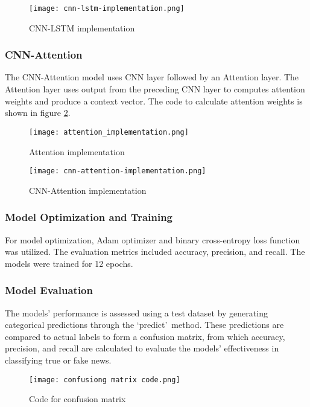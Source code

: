 \begin{figure}[h]
    \centering
    \texttt{[image: cnn-lstm-implementation.png]}
    \caption{CNN-LSTM implementation}
    \label{fig:cnn-lstm-implementation}
\end{figure}

\subsubsection{CNN-Attention}
The CNN-Attention model uses CNN layer followed by an Attention layer. The Attention layer uses output from the preceding CNN layer to computes attention weights and produce a context vector. The code to calculate attention weights is shown in figure \ref{fig:attention-implementation}.

\begin{figure}[h]
    \centering
    \texttt{[image: attention\_implementation.png]}
    \caption{Attention implementation}
    \label{fig:attention-implementation}
\end{figure}

\begin{figure}[h]
    \centering
    \texttt{[image: cnn-attention-implementation.png]}
    \caption{CNN-Attention implementation}
    \label{fig:cnn-attention-implementation}
\end{figure}

\clearpage
\subsubsection{Model Optimization and Training} 
For model optimization, Adam optimizer and binary cross-entropy loss function was utilized. The evaluation metrics included accuracy, precision, and recall. The models were trained for 12 epochs.

\subsubsection{Model Evaluation} 
The models' performance is assessed using a test dataset by generating categorical predictions through the \lq predict\rq\  method. These predictions are compared to actual labels to form a confusion matrix, from which accuracy, precision, and recall are calculated to evaluate the models' effectiveness in classifying true or fake news.

\begin{figure}[h]
    \centering
    \texttt{[image: confusiong matrix code.png]}
    \caption{Code for confusion matrix}    
\end{figure}

